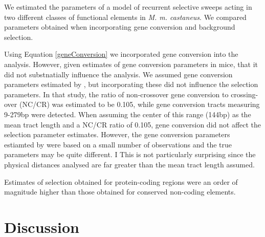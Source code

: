 \documentclass[11pt]{article}
\begin{document}
	We estimated the parameters of a model of recurrent selective sweeps acting in two different classes of functional elements in \textit{M. m. castaneus}. We compared parameters obtained when incorporating gene conversion and background selection.
	
	Using  Equation \ref{geneConversion} we incorporated gene conversion into the analysis. However, given estimates of gene conversion parameters in mice, that it did not substnatially influence the analysis. We assumed gene conversion parameters estimated by \cite{RN263}, but incorporating these did not influence the selection parameters. In that study, the ratio of non-crossover gene conversion to crossing-over (NC/CR) was estimated to be 0.105, while gene conversion tracts measuring 9-279bp were detected. When assuming the center of this range (144bp) as the mean tract length and a NC/CR ratio of 0.105, gene conversion did not affect the selection parameter estimates. However, the gene conversion parameters estiamted by \cite{RN263} were based on a small number of observations and the true parameters may be quite different. I
	This is not particularly surprising since the physical distances analysed are far greater than the mean tract length assumed.  

Estimates of selection obtained for protein-coding regions were an order of magnitude higher than those obtained for conserved non-coding elements. 







%
%

\section*{Discussion}
\end{document}
